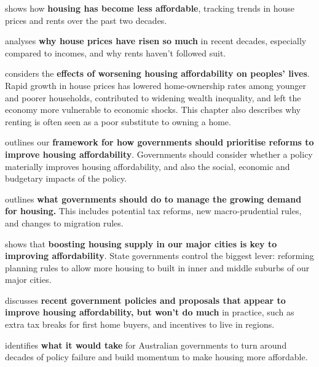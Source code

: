  shows how \textbf{housing has become less affordable}, tracking trends in house prices and rents over the past two decades.

 analyses \textbf{why house prices have risen so much} in recent decades, especially compared to incomes, and why rents haven't followed suit.

 considers the \textbf{effects of worsening housing affordability on peoples' lives}.
Rapid growth in house prices has lowered home-ownership rates among younger and poorer households, contributed to widening wealth inequality, and left the economy more vulnerable to economic shocks.
This chapter also describes why renting is often seen as a poor substitute to owning a home.

 outlines our \textbf{framework for how governments should prioritise reforms to improve housing affordability}.
Governments should consider whether a policy materially improves housing affordability, and also the social, economic and budgetary impacts of the policy.

 outlines \textbf{what governments should do to manage the growing demand for housing.}
This includes potential tax reforms, new macro-prudential rules, and changes to migration rules.

 shows that \textbf{boosting housing supply in our major cities is key to improving affordability}.
State governments control the biggest lever: reforming planning rules to allow more housing to built in inner and middle suburbs of our major cities.

 discusses \textbf{recent government policies and proposals that appear to improve housing affordability, but won't do much} in practice, such as extra tax breaks for first home buyers, and incentives to live in regions.

 identifies \textbf{what it would take} for Australian governments to turn around decades of policy failure and build momentum to make housing more affordable.

